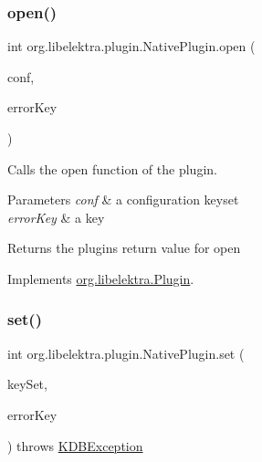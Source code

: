 \subsubsection{\texorpdfstring{open()}{open()}}
{\footnotesize\ttfamily int org.\+libelektra.\+plugin.\+Native\+Plugin.\+open (\begin{DoxyParamCaption}\item[{\hyperlink{classorg_1_1libelektra_1_1KeySet}{Key\+Set}}]{conf,  }\item[{\hyperlink{classorg_1_1libelektra_1_1Key}{Key}}]{error\+Key }\end{DoxyParamCaption})\hspace{0.3cm}{\ttfamily [inline]}}



Calls the open function of the plugin. 


\begin{DoxyParams}{Parameters}
{\em conf} & a configuration keyset \\
\hline
{\em error\+Key} & a key \\
\hline
\end{DoxyParams}
\begin{DoxyReturn}{Returns}
the plugin\textquotesingle{}s return value for open 
\end{DoxyReturn}


Implements \hyperlink{interfaceorg_1_1libelektra_1_1Plugin_a740f0602ea62e7a28c86fc801add8907}{org.\+libelektra.\+Plugin}.

\mbox{\label{classorg_1_1libelektra_1_1plugin_1_1NativePlugin_a9faeb1e6eb90a4c90681eeeb097eeb53}} 
\subsubsection{\texorpdfstring{set()}{set()}}
{\footnotesize\ttfamily int org.\+libelektra.\+plugin.\+Native\+Plugin.\+set (\begin{DoxyParamCaption}\item[{\hyperlink{classorg_1_1libelektra_1_1KeySet}{Key\+Set}}]{key\+Set,  }\item[{\hyperlink{classorg_1_1libelektra_1_1Key}{Key}}]{error\+Key }\end{DoxyParamCaption}) throws \hyperlink{classorg_1_1libelektra_1_1exception_1_1KDBException}{K\+D\+B\+Exception}\hspace{0.3cm}{\ttfamily [inline]}}



